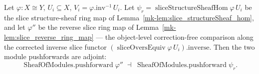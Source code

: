 \begin{lemma}\label{mk-lem:pushforward_slice_two_adjunction}
  \leanok

  Let \(\varphi : X \cong Y\), \(U_i \subseteq X\), \(V_i = \varphi.\mathrm{inv}^{-1}\,U_i\). Let
  \(\psi_r = \operatorname{sliceStructureSheafHom}\varphi\,U_i\) be the slice structure-sheaf ring map
  of Lemma~\ref{mk-lem:slice_structureSheaf_hom}, and let \(\varphi''\) be the reverse slice ring map of
  Lemma~\ref{mk-lem:slice_reverse_ring_map} --- the object-level correction-free comparison along the
  corrected inverse slice functor \((\operatorname{sliceOversEquiv}\varphi\,U_i).\mathrm{inverse}\).
  Then the two module pushforwards are adjoint:
  \[
    \operatorname{SheafOfModules.pushforward}\varphi'' \;\dashv\;
    \operatorname{SheafOfModules.pushforward}\psi_r .
  \]
\end{lemma}
